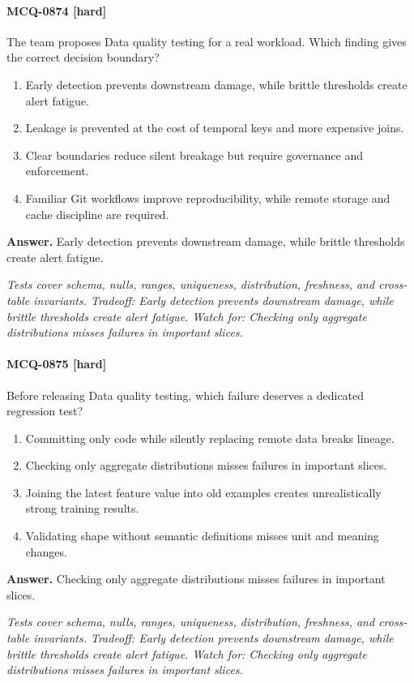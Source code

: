 \paragraph{MCQ-0874 [hard]} The team proposes Data quality testing for a real workload. Which finding gives the correct decision boundary?
\begin{enumerate}[label=\Alph*.]
\item Early detection prevents downstream damage, while brittle thresholds create alert fatigue.
\item Leakage is prevented at the cost of temporal keys and more expensive joins.
\item Clear boundaries reduce silent breakage but require governance and enforcement.
\item Familiar Git workflows improve reproducibility, while remote storage and cache discipline are required.
\end{enumerate}
\noindent\textbf{Answer.} Early detection prevents downstream damage, while brittle thresholds create alert fatigue.
\par\textit{Tests cover schema, nulls, ranges, uniqueness, distribution, freshness, and cross-table invariants. Tradeoff: Early detection prevents downstream damage, while brittle thresholds create alert fatigue. Watch for: Checking only aggregate distributions misses failures in important slices.}
\paragraph{MCQ-0875 [hard]} Before releasing Data quality testing, which failure deserves a dedicated regression test?
\begin{enumerate}[label=\Alph*.]
\item Committing only code while silently replacing remote data breaks lineage.
\item Checking only aggregate distributions misses failures in important slices.
\item Joining the latest feature value into old examples creates unrealistically strong training results.
\item Validating shape without semantic definitions misses unit and meaning changes.
\end{enumerate}
\noindent\textbf{Answer.} Checking only aggregate distributions misses failures in important slices.
\par\textit{Tests cover schema, nulls, ranges, uniqueness, distribution, freshness, and cross-table invariants. Tradeoff: Early detection prevents downstream damage, while brittle thresholds create alert fatigue. Watch for: Checking only aggregate distributions misses failures in important slices.}
